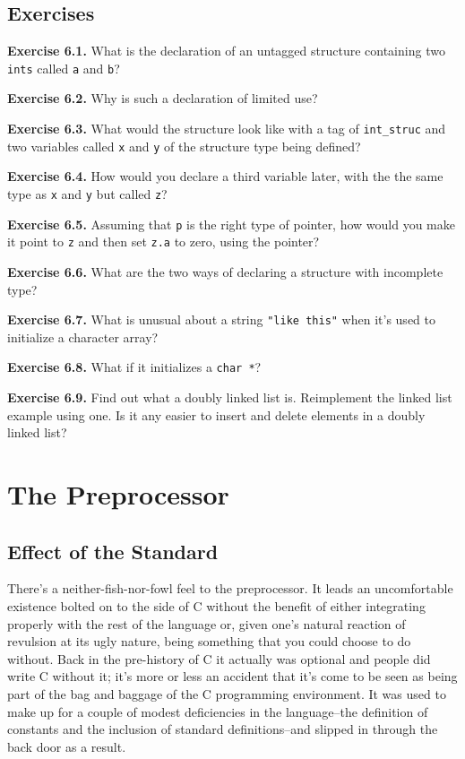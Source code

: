  
        \section{Exercises}
        


  \textbf{Exercise 6.1.} What is the declaration of an untagged structure
   containing two \texttt{ints} called \texttt{a} and
   \texttt{b}?


  \textbf{Exercise 6.2.} Why is such a declaration of limited use?


  \textbf{Exercise 6.3.} What would the structure look like with a tag of
   \texttt{int\_struc} and two variables called \texttt{x} and
   \texttt{y} of the structure type being defined?


  \textbf{Exercise 6.4.} How would you declare a third variable later, with the
   the same type as \texttt{x} and \texttt{y} but called
   \texttt{z}?


  \textbf{Exercise 6.5.} Assuming that \texttt{p} is the right type of
   pointer, how would you make it point to \texttt{z} and then set
   \texttt{z.a} to zero, using the pointer?


  \textbf{Exercise 6.6.} What are the two ways of declaring a structure with
   incomplete type?


  \textbf{Exercise 6.7.} What is unusual about a string \texttt{"like this"}
   when it's used to initialize a character array?


  \textbf{Exercise 6.8.} What if it initializes a
   \texttt{char *}?


  \textbf{Exercise 6.9.} Find out what a doubly linked list is. Reimplement the
   linked list example using one. Is it any easier to insert and delete
   elements in a doubly linked list?


   \chapter{The Preprocessor}\label{chap:preproc}


   \section{Effect of the Standard}


   There's a neither-fish-nor-fowl feel to the preprocessor. It leads an
   uncomfortable existence bolted on to the side of C without the benefit of
   either integrating properly with the rest of the language or, given one's
   natural reaction of revulsion at its ugly nature, being something that
   you could choose to do without. Back in the pre-history of C it actually
   was optional and people did write C without it; it's more or less an
   accident that it's come to be seen as being part of the bag and baggage
   of the C programming environment. It was used to make up for a couple of
   modest deficiencies in the language--the definition of constants and
   the inclusion of standard definitions--and slipped in through the
   back door as a result.


